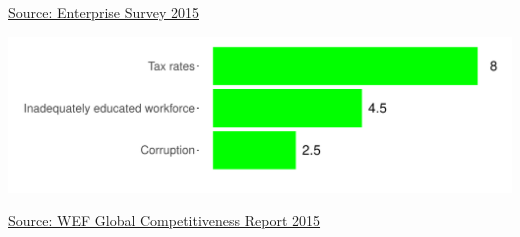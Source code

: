 \documentclass{article}\usepackage[]{graphicx}\usepackage[]{color}
\makeatletter
\def\maxwidth{ %
  \ifdim\Gin@nat@width>\linewidth
    \linewidth
  \else
    \Gin@nat@width
  \fi
}
\makeatother
\begin{document}
\begin{minipage}[b]{0.99\textwidth}
\begin{minipage}[b]{0.99\textwidth}
\begin{minipage}[c]{0.49\textwidth}
{}



      \hspace*{0.3cm} \raggedright\footnotesize{\href{https://www.enterprisesurveys.org/data}{Source: Enterprise Survey 2015}}
    \end{minipage}
    \begin{minipage}[c]{0.49\textwidth} %


{\centering \includegraphics[width=\maxwidth]{figure/top5constraintsWEF-1} 

}



    \hspace*{0.3cm} \raggedright\footnotesize{\href{http://www.weforum.org/reports/global-competitiveness-report-2015-2016}{Source: WEF Global Competitiveness Report 2015}}
    \end{minipage}
  \end{minipage}
\end{minipage}


\end{document}
